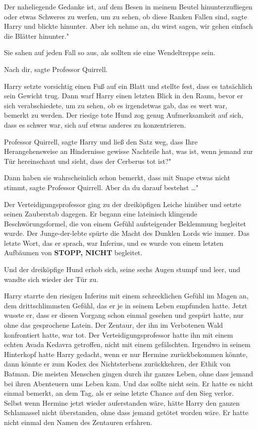 \glqq{}Der naheliegende Gedanke ist, auf dem Besen in meinem Beutel
hinunterzufliegen oder etwas Schweres zu werfen, um zu sehen, ob diese Ranken
Fallen sind\grqq{}, sagte Harry und blickte hinunter. \glqq{}Aber ich nehme an,
du wirst sagen, wir gehen einfach die Blätter hinunter."

Sie sahen auf jeden Fall so aus, als sollten sie eine Wendeltreppe sein.

\glqq{}Nach dir\grqq{}, sagte Professor Quirrell.

Harry setzte vorsichtig einen Fuß auf ein Blatt und stellte fest, dass es
tatsächlich sein Gewicht trug. Dann warf Harry einen letzten Blick in den Raum,
bevor er sich verabschiedete, um zu sehen, ob es irgendetwas gab, das es wert
war, bemerkt zu werden. Der riesige tote Hund zog genug Aufmerksamkeit auf sich,
dass es schwer war, sich auf etwas anderes zu konzentrieren.

\glqq{}Professor Quirrell\grqq{}, sagte Harry und ließ den Satz weg, dass Ihre
Herangehensweise an Hindernisse gewisse Nachteile hat, \glqq{}was ist, wenn
jemand zur Tür hereinschaut und sieht, dass der Cerberus tot ist?"

\glqq{}Dann haben sie wahrscheinlich schon bemerkt, dass mit Snape etwas nicht
stimmt\grqq{}, sagte Professor Quirrell. \glqq{}Aber da du darauf bestehst …"

Der Verteidigungsprofessor ging zu der dreiköpfigen Leiche hinüber und setzte
seinen Zauberstab dagegen. Er begann eine lateinisch klingende
Beschwörungsformel, die von einem Gefühl aufsteigender Beklemmung begleitet
wurde. Der Junge-der-lebte spürte die Macht des Dunklen Lords wie immer. Das
letzte Wort, das er sprach, war \glqq{}Inferius\grqq{}, und es wurde von einem
letzten Aufbäumen von \textbf{STOPP, NICHT} begleitet.

Und der dreiköpfige Hund erhob sich, seine sechs Augen stumpf und leer, und
wandte sich wieder der Tür zu.

Harry starrte den riesigen Inferius mit einem schrecklichen Gefühl im Magen an,
dem drittschlimmsten Gefühl, das er je in seinem Leben empfunden hatte. Jetzt
wusste er, dass er diesen Vorgang schon einmal gesehen und gespürt hatte, nur
ohne das gesprochene Latein. Der Zentaur, der ihn im Verbotenen Wald
konfrontiert hatte, war tot. Der Verteidigungsprofessor hatte ihn mit einem
echten Avada Kedavra getroffen, nicht mit einem gefälschten. Irgendwo in seinem
Hinterkopf hatte Harry gedacht, wenn er nur Hermine zurückbekommen könnte, dann
könnte er zum Kodex des Nichtsterbens zurückkehren, der Ethik von Batman. Die
meisten Menschen gingen durch ihr ganzes Leben, ohne dass jemand bei ihren
Abenteuern ums Leben kam. Und das sollte nicht sein. Er hatte es nicht einmal
bemerkt, an dem Tag, als er seine letzte Chance auf den Sieg verlor. Selbst wenn
Hermine jetzt wieder auferstanden wäre, hätte Harry den ganzen Schlamassel nicht
überstanden, ohne dass jemand getötet worden wäre. Er hatte nicht einmal den
Namen des Zentauren erfahren.


